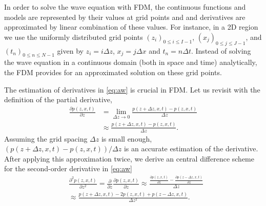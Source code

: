 \documentclass[11pt,titlepage]{article}
\theoremstyle{plain}
\theoremstyle{definition}
\theoremstyle{remark}
\numberwithin{equation}{section}
\begin{document}
In order to solve the wave equation with FDM, the continuous functions and models are represented by their values at grid points and and derivatives are approximated by linear combination of these values. For instance, in a 2D region we use the uniformly distributed grid points $(z_i)_{0\le i \le I-1 }$, $(x_j)_{0\le j \le J-1}$, and $(t_n)_{0\le n \le N-1}$ given by $z_i = i\Delta z$, $x_j = j\Delta x$ and $t_n=n\Delta t$. Instead of solving the wave equation in a continuous domain (both in space and time) analytically, the FDM provides for an approximated solution on these grid points.  

The estimation of derivatives in \eqref{eq:aw} is crucial in FDM. Let us revisit with the definition of the partial derivative, 
 \begin{equation}
  \begin{aligned}
  \frac{\partial p(z, x, t)}{\partial z} &= \lim\limits_{\Delta z \rightarrow 0} \frac{p(z+\Delta z, x, t) - p(z, x, t)}{\Delta z}\\
  &\approx \frac{p(z+\Delta z, x, t) - p(z, x, t)}{\Delta z}.
  \end{aligned}
  \end{equation}
 Assuming the grid spacing $\Delta z$ is small enough, $(p(z+\Delta z, x, t) - p(z, x, t))/\Delta z$ is an accurate estimation of the derivative. After applying this approximation twice, we derive an central difference scheme for the second-order derivative in \eqref{eq:aw}
  \begin{equation}
  \begin{aligned}
  &\frac{\partial^2 p(z, x, t)}{\partial z^2} = \frac{\partial}{\partial z}\frac{\partial p(z, x, t)}{\partial z} \approx \frac{\frac{\partial p(z, x, t)}{\partial z} - \frac{\partial p(z-\Delta z, x, t)}{\partial z}}{\Delta z}\\
  &\approx \frac{p(z+\Delta z, x, t) - 2p(z, x, t) + p(z-\Delta z, x, t)}{\Delta z^2}.
  \end{aligned}
  \end{equation}
  
\end{document}
